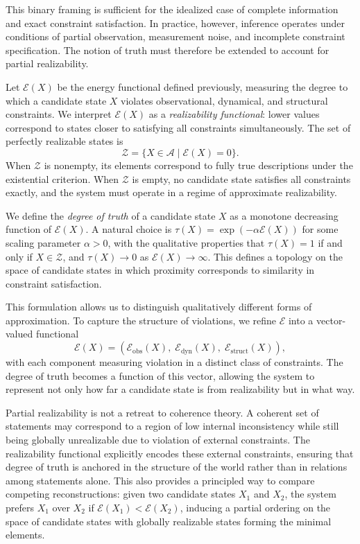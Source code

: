 \documentclass[11pt, oneside]{article}
\begin{document}
This binary framing is sufficient for the idealized case of complete information and exact constraint satisfaction. In practice, however, inference operates under conditions of partial observation, measurement noise, and incomplete constraint specification. The notion of truth must therefore be extended to account for partial realizability.

Let $\mathcal{E}(X)$ be the energy functional defined previously, measuring the degree to which a candidate state $X$ violates observational, dynamical, and structural constraints. We interpret $\mathcal{E}(X)$ as a \emph{realizability functional}: lower values correspond to states closer to satisfying all constraints simultaneously. The set of perfectly realizable states is
\[
\mathcal{Z} = \{ X \in \mathcal{A} \mid \mathcal{E}(X) = 0 \}.
\]
When $\mathcal{Z}$ is nonempty, its elements correspond to fully true descriptions under the existential criterion. When $\mathcal{Z}$ is empty, no candidate state satisfies all constraints exactly, and the system must operate in a regime of approximate realizability.

We define the \emph{degree of truth} of a candidate state $X$ as a monotone decreasing function of $\mathcal{E}(X)$. A natural choice is $\tau(X) = \exp(-\alpha \mathcal{E}(X))$ for some scaling parameter $\alpha > 0$, with the qualitative properties that $\tau(X) = 1$ if and only if $X \in \mathcal{Z}$, and $\tau(X) \to 0$ as $\mathcal{E}(X) \to \infty$. This defines a topology on the space of candidate states in which proximity corresponds to similarity in constraint satisfaction.

This formulation allows us to distinguish qualitatively different forms of approximation. To capture the structure of violations, we refine $\mathcal{E}$ into a vector-valued functional
\[
\mathcal{E}(X) = (\mathcal{E}_{\mathrm{obs}}(X),\; \mathcal{E}_{\mathrm{dyn}}(X),\; \mathcal{E}_{\mathrm{struct}}(X)),
\]
with each component measuring violation in a distinct class of constraints. The degree of truth becomes a function of this vector, allowing the system to represent not only how far a candidate state is from realizability but in what way.

Partial realizability is not a retreat to coherence theory. A coherent set of statements may correspond to a region of low internal inconsistency while still being globally unrealizable due to violation of external constraints. The realizability functional explicitly encodes these external constraints, ensuring that degree of truth is anchored in the structure of the world rather than in relations among statements alone. This also provides a principled way to compare competing reconstructions: given two candidate states $X_1$ and $X_2$, the system prefers $X_1$ over $X_2$ if $\mathcal{E}(X_1) < \mathcal{E}(X_2)$, inducing a partial ordering on the space of candidate states with globally realizable states forming the minimal elements.
\end{document}

